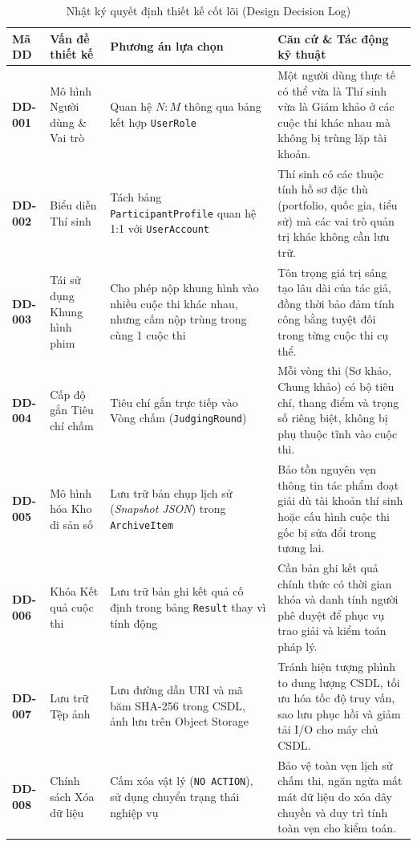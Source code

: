 \begin{table}[!ht]
\centering
\caption{Nhật ký quyết định thiết kế cốt lõi (Design Decision Log)}
\label{tab:c7_decision_log}
\scriptsize
\begin{tabularx}{\textwidth}{p{1.5cm}p{3.2cm}p{3.6cm}>{\raggedright\arraybackslash}X}
\toprule
\textbf{Mã DD} & \textbf{Vấn đề thiết kế} & \textbf{Phương án lựa chọn} & \textbf{Căn cứ \& Tác động kỹ thuật} \\
\midrule
\textbf{DD-001} & Mô hình Người dùng \& Vai trò & Quan hệ $N:M$ thông qua bảng kết hợp \texttt{UserRole} & Một người dùng thực tế có thể vừa là Thí sinh vừa là Giám khảo ở các cuộc thi khác nhau mà không bị trùng lặp tài khoản. \\
\textbf{DD-002} & Biểu diễn Thí sinh & Tách bảng \texttt{ParticipantProfile} quan hệ 1:1 với \texttt{UserAccount} & Thí sinh có các thuộc tính hồ sơ đặc thù (portfolio, quốc gia, tiểu sử) mà các vai trò quản trị khác không cần lưu trữ. \\
\textbf{DD-003} & Tái sử dụng Khung hình phim & Cho phép nộp khung hình vào nhiều cuộc thi khác nhau, nhưng cấm nộp trùng trong cùng 1 cuộc thi & Tôn trọng giá trị sáng tạo lâu dài của tác giả, đồng thời bảo đảm tính công bằng tuyệt đối trong từng cuộc thi cụ thể. \\
\textbf{DD-004} & Cấp độ gắn Tiêu chí chấm & Tiêu chí gắn trực tiếp vào Vòng chấm (\texttt{JudgingRound}) & Mỗi vòng thi (Sơ khảo, Chung khảo) có bộ tiêu chí, thang điểm và trọng số riêng biệt, không bị phụ thuộc tĩnh vào cuộc thi. \\
\textbf{DD-005} & Mô hình hóa Kho di sản số & Lưu trữ bản chụp lịch sử (\textit{Snapshot JSON}) trong \texttt{ArchiveItem} & Bảo tồn nguyên vẹn thông tin tác phẩm đoạt giải dù tài khoản thí sinh hoặc cấu hình cuộc thi gốc bị sửa đổi trong tương lai. \\
\textbf{DD-006} & Khóa Kết quả cuộc thi & Lưu trữ bản ghi kết quả cố định trong bảng \texttt{Result} thay vì tính động & Cần bản ghi kết quả chính thức có thời gian khóa và danh tính người phê duyệt để phục vụ trao giải và kiểm toán pháp lý. \\
\textbf{DD-007} & Lưu trữ Tệp ảnh & Lưu đường dẫn URI và mã băm SHA-256 trong CSDL, ảnh lưu trên Object Storage & Tránh hiện tượng phình to dung lượng CSDL, tối ưu hóa tốc độ truy vấn, sao lưu phục hồi và giảm tải I/O cho máy chủ CSDL. \\
\textbf{DD-008} & Chính sách Xóa dữ liệu & Cấm xóa vật lý (\texttt{NO ACTION}), sử dụng chuyển trạng thái nghiệp vụ & Bảo vệ toàn vẹn lịch sử chấm thi, ngăn ngừa mất mát dữ liệu do xóa dây chuyền và duy trì tính toàn vẹn cho kiểm toán. \\
\bottomrule
\end{tabularx}
\end{table}

